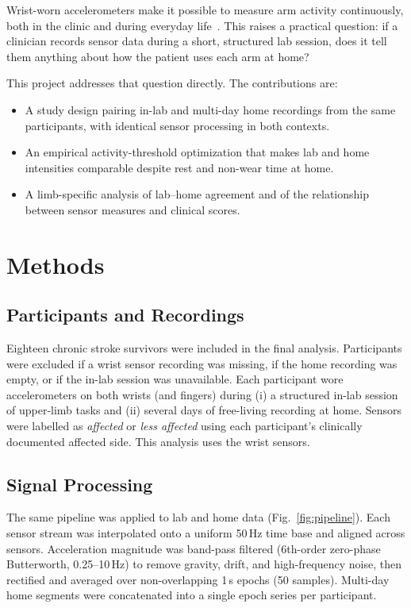 \documentclass[conference]{IEEEtran}
\begin{document}
Wrist-worn accelerometers make it possible to measure arm activity continuously,
both in the clinic and during everyday life~\cite{uswatte2006accel,bailey2014}.
This raises a practical question: if a clinician records sensor data during a
short, structured lab session, does it tell them anything about how the patient
uses each arm at home?

This project addresses that question directly. The contributions are:
\begin{itemize}
  \item A study design pairing in-lab and multi-day home recordings from the same
        participants, with identical sensor processing in both contexts.
  \item An empirical activity-threshold optimization that makes lab and home
        intensities comparable despite rest and non-wear time at home.
  \item A limb-specific analysis of lab–home agreement and of the relationship
        between sensor measures and clinical scores.
\end{itemize}

\section{Methods}

\subsection{Participants and Recordings}

Eighteen chronic stroke survivors were included in the final analysis.
Participants were excluded if a wrist sensor recording was missing, if the home
recording was empty, or if the in-lab session was unavailable. Each participant
wore accelerometers on both wrists (and fingers) during (i) a structured in-lab
session of upper-limb tasks and (ii) several days of free-living recording at home.
Sensors were labelled as \emph{affected} or \emph{less affected} using each
participant's clinically documented affected side. This analysis uses the wrist
sensors.

\subsection{Signal Processing}

The same pipeline was applied to lab and home data (Fig.~\ref{fig:pipeline}).
Each sensor stream was interpolated onto a uniform 50\,Hz time base and aligned
across sensors. Acceleration magnitude was band-pass filtered (6th-order
zero-phase Butterworth, 0.25--10\,Hz) to remove gravity, drift, and high-frequency
noise, then rectified and averaged over non-overlapping 1\,s epochs (50 samples).
Multi-day home segments were concatenated into a single epoch series per
participant.
\end{document}
